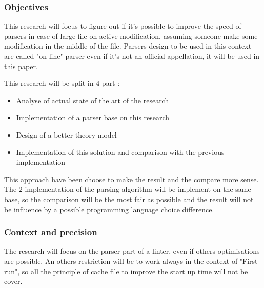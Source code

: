 \subsubsection{Objectives}
This research will focus to figure out if it's possible to improve the speed of parsers in case of large file on active modification, assuming someone make some modification in the middle of the file. Parsers design to be used in this context are called "on-line" parser even if it's not an official appellation, it will be used in this paper.

This research will be split in 4 part :
\begin{itemize}
\item Analyse of actual state of the art of the research
\item Implementation of a parser base on this research
\item Design of a better theory model
\item Implementation of this solution and comparison with the previous implementation
\end{itemize}

This approach have been choose to make the result and the compare more sense. The 2 implementation of the parsing algorithm will be implement on the same base, so the comparison will be the most fair as possible and the result will not be influence by a possible programming language choice difference.
\\
\subsubsection{Context and precision}
The research will focus on the parser part of a linter, even if others optimisations are possible.
An others restriction will be to work always in the context of "First run", so all the principle of cache file to improve the start up time will not be cover.
